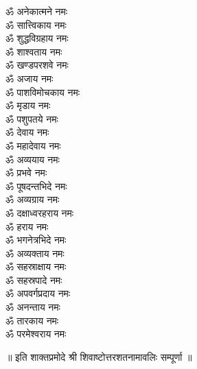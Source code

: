 \begin{multicols}{2}
\begin{flushleft}
ॐ अनेकात्मने नमः\\
ॐ सात्त्विकाय नमः\\
ॐ शुद्धविग्रहाय नमः\\
ॐ शाश्वताय नमः\\
ॐ खण्डपरशवे नमः\\
ॐ अजाय  नमः\\
ॐ पाशविमोचकाय नमः\hfill{}\\
ॐ मृडाय नमः\\
ॐ पशुपतये नमः\\
ॐ देवाय नमः\\
ॐ महादेवाय नमः\\
ॐ अव्ययाय नमः\\
ॐ प्रभवे नमः\\
ॐ पूषदन्तभिदे नमः\\
ॐ अव्यग्राय नमः\\
ॐ दक्षाध्वरहराय नमः\\
ॐ हराय नमः\hfill{}\\
ॐ भगनेत्रभिदे नमः\\
ॐ अव्यक्ताय नमः\\
ॐ सहस्राक्षाय नमः\\
ॐ सहस्रपादे नमः\\
ॐ अपवर्गप्रदाय नमः\\
ॐ अनन्ताय नमः\\
ॐ तारकाय नमः\\
ॐ परमेश्वराय नमः\\
\end{flushleft}
\end{multicols}
\centerline{॥ इति शाक्तप्रमोदे श्री शिवाष्टोत्तरशतनामावलिः सम्पूर्णा ॥}
